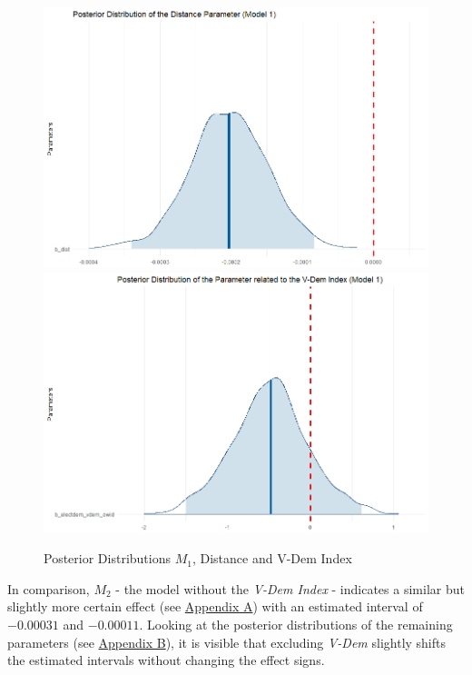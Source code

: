 \documentclass[12pt,a4paper]{article}
\begin{document}
\begin{figure}[h]
\center
\label{F:3}
\includegraphics[scale=0.25]{PosteriorPlot_Distance_Model1.png}
\includegraphics[scale=0.25]{PosteriorPlot_VDem_Model1.png}
\caption{Posterior Distributions $M_1$, Distance and V-Dem Index}
\end{figure}


In comparison, $M_2$ - the model without the \textit{V-Dem Index} -  indicates a similar but slightly more certain effect (see \hyperref[Appendix Tables]{\color{blue}Appendix A}) with an estimated interval of $-0.00031$ and $-0.00011$. Looking at the posterior distributions of the remaining parameters (see \hyperref[Appendix Figures]{\color{blue}Appendix B}), it is visible that excluding \textit{V-Dem} slightly shifts the estimated intervals without changing the effect signs.
\end{document}
